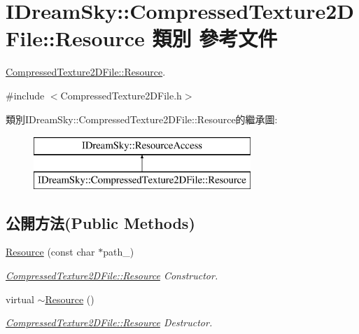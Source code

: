 \hypertarget{class_i_dream_sky_1_1_compressed_texture2_d_file_1_1_resource}{}\section{I\+Dream\+Sky\+:\+:Compressed\+Texture2\+D\+File\+:\+:Resource 類別 參考文件}
\label{class_i_dream_sky_1_1_compressed_texture2_d_file_1_1_resource}


\hyperlink{class_i_dream_sky_1_1_compressed_texture2_d_file_1_1_resource}{Compressed\+Texture2\+D\+File\+::\+Resource}.  




{\ttfamily \#include $<$Compressed\+Texture2\+D\+File.\+h$>$}

類別\+I\+Dream\+Sky\+:\+:Compressed\+Texture2\+D\+File\+:\+:Resource的繼承圖\+:\begin{figure}[H]
\begin{center}
\leavevmode
\includegraphics[height=2.000000cm]{class_i_dream_sky_1_1_compressed_texture2_d_file_1_1_resource}
\end{center}
\end{figure}
\subsection*{公開方法(Public Methods)}
\begin{DoxyCompactItemize}
\item 
\hyperlink{class_i_dream_sky_1_1_compressed_texture2_d_file_1_1_resource_acdd68c7fa6240c95ee63c4ad1ef2451c}{Resource} (const char $\ast$path\+\_\+)
\begin{DoxyCompactList}\small\item\em \hyperlink{class_i_dream_sky_1_1_compressed_texture2_d_file_1_1_resource}{Compressed\+Texture2\+D\+File\+::\+Resource} Constructor. \end{DoxyCompactList}\item 
virtual \hyperlink{class_i_dream_sky_1_1_compressed_texture2_d_file_1_1_resource_a0d912cc9dc6c2709174faaac248eddfa}{$\sim$\+Resource} ()
\begin{DoxyCompactList}\small\item\em \hyperlink{class_i_dream_sky_1_1_compressed_texture2_d_file_1_1_resource}{Compressed\+Texture2\+D\+File\+::\+Resource} Destructor. \end{DoxyCompactList}\end{DoxyCompactItemize}
